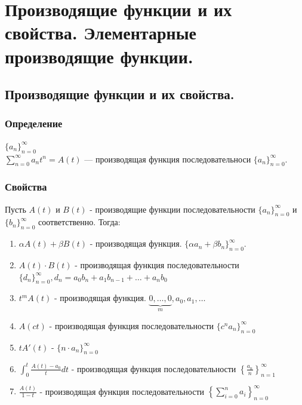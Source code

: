 \documentclass[12pt]{article}
\begin{document}
\section{Производящие функции и их свойства. Элементарные производящие функции.}
\subsection{Производящие функции и их свойства.}
\subsubsection{Определение}
	$ \{ a_n \}_{n=0}^\infty $\\
	$ \displaystyle \sum_{n=0}^\infty a_n t^n = A(t)$ — производящая функция последовательноси $ \{ a_n \}_{n=0}^\infty$.\\
\subsubsection{Свойства}
Пусть $A(t)$ и $B(t)$ - производящие функции последовательности $\{ a_n \}_{n=0}^\infty$ и $\{ b_n \}_{n=0}^\infty$ соответственно. Тогда:
\begin{enumerate}
	\item $ \alpha A(t) + \beta B(t)$ -  производящая функция. $ \{ \alpha a_n + \beta b_n \}_{n=0}^\infty $.
	\item $ A(t)\cdot B(t)$ - производящая функция последовательности $ \{ d_n \}_{n=0}^\infty, d_n = a_0b_n + a_1b_{n-1} +  \ldots  + a_nb_0$
	\item $ t^m A(t)$ - производящая функция. $ \underset{m}{\underbrace{0, \ldots ,0}}, a_0, a_1, \ldots $
	\item $ A(ct)$ - производящая функция последовательности $\{ c^n a_n \}_{n=0}^\infty $
	\item $ tA'(t)$ - $\{ n\cdot a_n \}_{n=0}^\infty $
	\item $ \displaystyle \int_{0}^t \frac{A(t)-a_0}{t}dt$ - производящая функция последовательности $ \displaystyle \left\{ \frac{a_n}{n} \right\}_{n=1}^\infty $
	\item $ \displaystyle \frac{A(t)}{1-t}$ - производящая функция последовательности $ \displaystyle \left\{ \sum_{i=0}^n a_i \right\}_{n=0}^\infty $
\end{enumerate}
\end{document}
